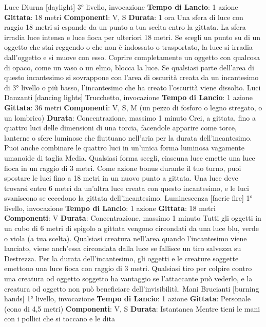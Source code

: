 \begin{multicols}{2}
Luce Diurna
[daylight]
3° livello, invocazione
\textbf{Tempo di Lancio}: 1 azione
\textbf{Gittata}: 18 metri
\textbf{Componenti}: V, S
\textbf{Durata}: 1 ora
Una sfera di luce con raggio 18 metri si espande da un
punto a tua scelta entro la gittata. La sfera irradia luce
intensa e luce fioca per ulteriori 18 metri.
Se scegli un punto su di un oggetto che stai reggendo o
che non è indossato o trasportato, la luce si irradia
dall’oggetto e si muove con esso. Coprire
completamente un oggetto con qualcosa di opaco,
come un vaso o un elmo, blocca la luce.
Se qualsiasi parte dell’area di questo incantesimo si
sovrappone con l’area di oscurità creata da un
incantesimo di 3° livello o più basso, l’incantesimo che
ha creato l’oscurità viene dissolto.
Luci Danzanti
[dancing lights]
Trucchetto, invocazione
\textbf{Tempo di Lancio}: 1 azione
\textbf{Gittata}: 36 metri
\textbf{Componenti}: V, S, M (un pezzo di fosforo o legno
stregato, o un lombrico)
\textbf{Durata}: Concentrazione, massimo 1 minuto
Crei, a gittata, fino a quattro luci delle dimensioni di una
torcia, facendole apparire come torce, lanterne o sfere
luminose che fluttuano nell’aria per la durata
dell’incantesimo. Puoi anche combinare le quattro luci
in un’unica forma luminosa vagamente umanoide di
taglia Media. Qualsiasi forma scegli, ciascuna luce
emette una luce fioca in un raggio di 3 metri.
Come azione bonus durante il tuo turno, puoi spostare
le luci fino a 18 metri in un nuovo punto a gittata. Una
luce deve trovarsi entro 6 metri da un’altra luce creata
con questo incantesimo, e le luci svaniscono se
eccedono la gittata dell’incantesimo.
Luminescenza
[faerie fire]
1° livello, invocazione
\textbf{Tempo di Lancio}: 1 azione
\textbf{Gittata}: 18 metri
\textbf{Componenti}: V
\textbf{Durata}: Concentrazione, massimo 1 minuto
Tutti gli oggetti in un cubo di 6 metri di spigolo a gittata
vengono circondati da una luce blu, verde o viola (a tua
scelta). Qualsiasi creatura nell’area quando
l’incantesimo viene lanciato, viene anch’essa circondata
dalla luce se fallisce un tiro salvezza su Destrezza. Per
la durata dell’incantesimo, gli oggetti e le creature
soggette emettono una luce fioca con raggio di 3 metri.
Qualsiasi tiro per colpire contro una creatura od oggetto
soggetto ha vantaggio se l’attaccante può vederlo, e la
creatura od oggetto non può beneficiare dell’invisibilità.
Mani Brucianti
[burning hands]
1° livello, invocazione
\textbf{Tempo di Lancio}: 1 azione
\textbf{Gittata}: Personale (cono di 4,5 metri)
\textbf{Componenti}: V, S
\textbf{Durata}: Istantanea
Mentre tieni le mani con i pollici che si toccano e le dita

\end{multicols}
